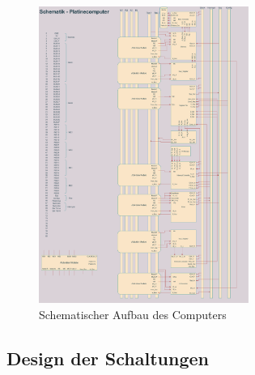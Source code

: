 \documentclass{scrartcl}
\begin{document}
    \begin{figure}
        \vspace{-15pt}
    \includegraphics[width=0.612\textwidth]{arch.drawio}
        \caption{Schematischer Aufbau des Computers\label{img:schematic_all}}
        \vspace{-15pt}
    \end{figure}

    \newpage
    \subsection{Design der Schaltungen}
    \vspace{-15pt}
\end{document}
